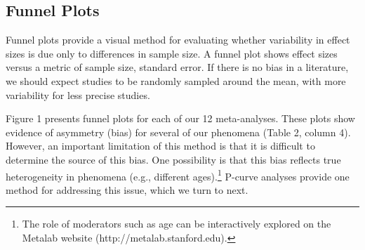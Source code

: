 \documentclass[9pt,twocolumn,twoside,lineno]{pnas-new}
\begin{document}
\begin{table}[tbhp]
\begin{tabular*}{8.7cm}{lrrrr}
\bottomrule
\end{tabular*}


\end{table}



\subsection*{Funnel Plots}\label{funnel-plots}

Funnel plots provide a visual method for evaluating whether variability
in effect sizes is due only to differences in sample size. A funnel plot
shows effect sizes versus a metric of sample size, standard error. If
there is no bias in a literature, we should expect studies to be
randomly sampled around the mean, with more variability for less precise
studies.

Figure 1 presents funnel plots for each of our 12 meta-analyses. These
plots show evidence of asymmetry (bias) for several of our phenomena
(Table 2, column 4). However, an important limitation of this method is
that it is difficult to determine the source of this bias. One
possibility is that this bias reflects true heterogeneity in phenomena
(e.g., different
ages).\footnote{The role of moderators such as age can be interactively explored on the Metalab website (http://metalab.stanford.edu).}
P-curve analyses provide one method for addressing this issue, which we
turn to next.
\end{document}
